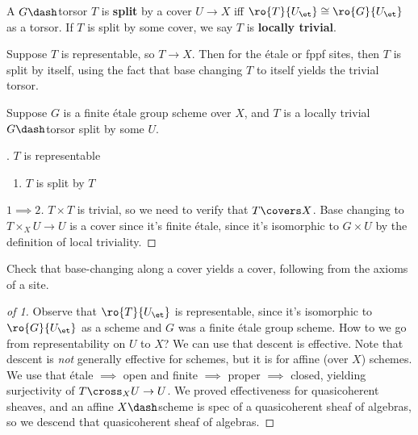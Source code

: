 \begin{definition}[?]

A \(G\dash\)torsor \(T\) is \textbf{split} by a cover \(U\to X\) iff
\(\ro{T}{U_\et} \cong \ro{G}{U_\et}\) as a torsor. If \(T\) is split by
some cover, we say \(T\) is \textbf{locally trivial}.

\end{definition}

\begin{remark}

Suppose \(T\) is representable, so \(T\to X\). Then for the étale or
fppf sites, then \(T\) is split by itself, using the fact that base
changing \(T\) to itself yields the trivial torsor.

\end{remark}

\begin{example}[?]

Suppose \(G\) is a finite étale group scheme over \(X\), and \(T\) is a
locally trivial \(G\dash\)torsor split by some \(U\).

\begin{claim}

. \(T\) is representable

\begin{enumerate}
\def\labelenumi{\arabic{enumi}.}
\setcounter{enumi}{1}
\tightlist
\item
  \(T\) is split by \(T\)
\end{enumerate}

\end{claim}

\begin{proof}[$1\implies 2$]

\(T\times T\) is trivial, so we need to verify that \(T \covers X\).
Base changing to \(T\times_X U \to U\) is a cover since it's finite
étale, since it's isomorphic to \(G\times U\) by the definition of local
triviality.

\end{proof}

\begin{exercise}[?]

Check that base-changing along a cover yields a cover, following from
the axioms of a site.

\end{exercise}

\begin{proof}[of 1]

Observe that \(\ro{T}{U_\et}\) is representable, since it's isomorphic
to \(\ro{G}{U_\et}\) as a scheme and \(G\) was a finite étale group
scheme. How to we go from representability on \(U\) to \(X\)? We can use
that descent is effective. Note that descent is \emph{not} generally
effective for schemes, but it is for affine (over \(X\)) schemes. We use
that étale \(\implies\) open and finite \(\implies\) proper \(\implies\)
closed, yielding surjectivity of \(T\cross_X U \to U\). We proved
effectiveness for quasicoherent sheaves, and an affine \(X\dash\)scheme
is spec of a quasicoherent sheaf of algebras, so we descend that
quasicoherent sheaf of algebras.


\end{proof}
\end{example}
